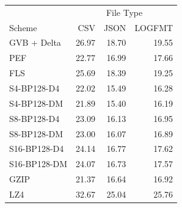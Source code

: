 \begin{tabular}{lrrr}
\toprule
 & \multicolumn{3}{c}{File Type} \\
Scheme & CSV & JSON & LOGFMT \\
\midrule
GVB + Delta & 26.97 & 18.70 & 19.55 \\
PEF & 22.77 & 16.99 & 17.66 \\
FLS & 25.69 & 18.39 & 19.25 \\
S4-BP128-D4 & 22.02 & 15.49 & 16.28 \\
S4-BP128-DM & 21.89 & 15.40 & 16.19 \\
S8-BP128-D4 & 23.09 & 16.13 & 16.95 \\
S8-BP128-DM & 23.00 & 16.07 & 16.89 \\
S16-BP128-D4 & 24.14 & 16.77 & 17.62 \\
S16-BP128-DM & 24.07 & 16.73 & 17.57 \\
GZIP & 21.37 & 16.64 & 16.92 \\
LZ4 & 32.67 & 25.04 & 25.76 \\
\bottomrule
\end{tabular}
